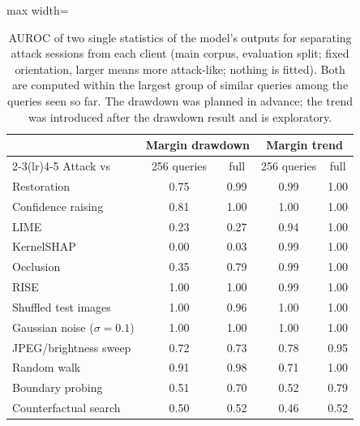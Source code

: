 \begin{table}[!tbp]
\centering\footnotesize\setlength{\tabcolsep}{4pt}
\caption{AUROC of two single statistics of the model's outputs for separating attack sessions from each client (main corpus, evaluation split; fixed orientation, larger means more attack-like; nothing is fitted). Both are computed within the largest group of similar queries among the queries seen so far. The drawdown was planned in advance; the trend was introduced after the drawdown result and is exploratory.}
\label{tab:outputstats}
\vspace{3pt}
\begin{adjustbox}{max width=\textwidth}
\begin{tabular}{lcccc}
\toprule
& \multicolumn{2}{c}{Margin drawdown} & \multicolumn{2}{c}{Margin trend} \\
\cmidrule(lr){2-3}\cmidrule(lr){4-5}
Attack vs & 256 queries & full & 256 queries & full \\
\midrule
Restoration & 0.75 & 0.99 & 0.99 & 1.00 \\
Confidence raising & 0.81 & 1.00 & 1.00 & 1.00 \\
LIME & 0.23 & 0.27 & 0.94 & 1.00 \\
KernelSHAP & 0.00 & 0.03 & 0.99 & 1.00 \\
Occlusion & 0.35 & 0.79 & 0.99 & 1.00 \\
RISE & 1.00 & 1.00 & 0.99 & 1.00 \\
Shuffled test images & 1.00 & 0.96 & 1.00 & 1.00 \\
Gaussian noise ($\sigma=0.1$) & 1.00 & 1.00 & 1.00 & 1.00 \\
JPEG/brightness sweep & 0.72 & 0.73 & 0.78 & 0.95 \\
Random walk & 0.91 & 0.98 & 0.71 & 1.00 \\
Boundary probing & 0.51 & 0.70 & 0.52 & 0.79 \\
Counterfactual search & 0.50 & 0.52 & 0.46 & 0.52 \\
\bottomrule
\end{tabular}
\end{adjustbox}
\end{table}
